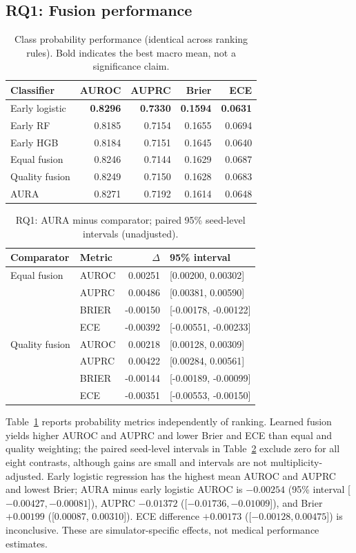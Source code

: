 \documentclass[conference]{IEEEtran}
\begin{document}
\subsection{RQ1: Fusion performance}
\begin{table}[t]
\caption{Class probability performance (identical across ranking rules). Bold indicates the best macro mean, not a significance claim.}
\label{tab:macro}
\centering\footnotesize
\begin{tabular}{@{}lrrrr@{}}\toprule
Classifier & AUROC & AUPRC & Brier & ECE\\\midrule
Early logistic & \textbf{0.8296} & \textbf{0.7330} & \textbf{0.1594} & \textbf{0.0631}\\
Early RF & 0.8185 & 0.7154 & 0.1655 & 0.0694\\
Early HGB & 0.8184 & 0.7151 & 0.1645 & 0.0640\\
Equal fusion & 0.8246 & 0.7144 & 0.1629 & 0.0687\\
Quality fusion & 0.8249 & 0.7150 & 0.1628 & 0.0683\\
AURA & 0.8271 & 0.7192 & 0.1614 & 0.0648\\\bottomrule
\end{tabular}
\end{table}
\begin{table}[t]
\caption{RQ1: AURA minus comparator; paired 95\% seed-level intervals (unadjusted).}
\label{tab:fusionci}
\centering\footnotesize
\begin{tabular}{@{}llrl@{}}\toprule
Comparator & Metric & $\Delta$ & 95\% interval\\\midrule
Equal fusion & AUROC & 0.00251 & [0.00200, 0.00302]\\
 & AUPRC & 0.00486 & [0.00381, 0.00590]\\
 & BRIER & -0.00150 & [-0.00178, -0.00122]\\
 & ECE & -0.00392 & [-0.00551, -0.00233]\\
Quality fusion & AUROC & 0.00218 & [0.00128, 0.00309]\\
 & AUPRC & 0.00422 & [0.00284, 0.00561]\\
 & BRIER & -0.00144 & [-0.00189, -0.00099]\\
 & ECE & -0.00351 & [-0.00553, -0.00150]\\\bottomrule
\end{tabular}
\end{table}
Table~\ref{tab:macro} reports probability metrics independently of ranking. Learned fusion yields higher AUROC and AUPRC and lower Brier and ECE than equal and quality weighting; the paired seed-level intervals in Table~\ref{tab:fusionci} exclude zero for all eight contrasts, although gains are small and intervals are not multiplicity-adjusted. Early logistic regression has the highest mean AUROC and AUPRC and lowest Brier; AURA minus early logistic AUROC is $-0.00254$ (95\% interval [$-0.00427,-0.00081$]), AUPRC $-0.01372$ ([$-0.01736,-0.01009$]), and Brier $+0.00199$ ([0.00087, 0.00310]). ECE difference $+0.00173$ ([$-0.00128,0.00475$]) is inconclusive. These are simulator-specific effects, not medical performance estimates.
\end{document}
